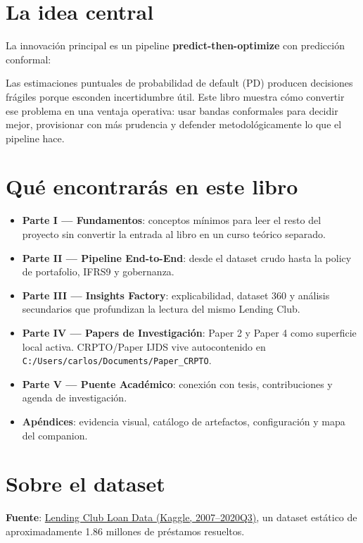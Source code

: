 \documentclass[
  spanish,
  11pt,
  letterpaper,
]{scrbook}
\providecommand{\tightlist}{%
  \setlength{\itemsep}{0pt}\setlength{\parskip}{0pt}}
\theoremstyle{plain}
\theoremstyle{remark}
\begin{document}
\section{La idea central}\label{la-idea-central}

La innovación principal es un pipeline \textbf{predict-then-optimize}
con predicción conformal:

Las estimaciones puntuales de probabilidad de default (PD) producen
decisiones frágiles porque esconden incertidumbre útil. Este libro
muestra cómo convertir ese problema en una ventaja operativa: usar
bandas conformales para decidir mejor, provisionar con más prudencia y
defender metodológicamente lo que el pipeline hace.

\section{Qué encontrarás en este
libro}\label{quuxe9-encontraruxe1s-en-este-libro}

\begin{itemize}
\tightlist
\item
  \textbf{Parte I --- Fundamentos}: conceptos mínimos para leer el resto
  del proyecto sin convertir la entrada al libro en un curso teórico
  separado.
\item
  \textbf{Parte II --- Pipeline End-to-End}: desde el dataset crudo
  hasta la policy de portafolio, IFRS9 y gobernanza.
\item
  \textbf{Parte III --- Insights Factory}: explicabilidad, dataset 360 y
  análisis secundarios que profundizan la lectura del mismo Lending
  Club.
\item
  \textbf{Parte IV --- Papers de Investigación}: Paper 2 y Paper 4 como
  superficie local activa. CRPTO/Paper IJDS vive autocontenido en
  \texttt{C:/Users/carlos/Documents/Paper\_CRPTO}.
\item
  \textbf{Parte V --- Puente Académico}: conexión con tesis,
  contribuciones y agenda de investigación.
\item
  \textbf{Apéndices}: evidencia visual, catálogo de artefactos,
  configuración y mapa del companion.
\end{itemize}

\section{Sobre el dataset}\label{sobre-el-dataset}

\textbf{Fuente}:
\href{https://www.kaggle.com/datasets/ethon0426/lending-club-20072020q1/data}{Lending
Club Loan Data (Kaggle, 2007--2020Q3)}, un dataset estático de
aproximadamente 1.86 millones de préstamos resueltos.
\end{document}
